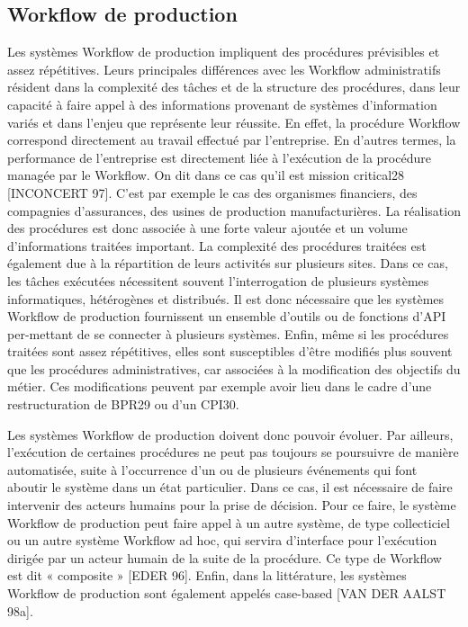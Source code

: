 \subsection{Workflow de production} 
Les systèmes Workflow de production impliquent des procédures prévisibles et assez répétitives. Leurs principales différences avec les Workflow administratifs résident dans la
complexité des tâches et de la structure des procédures, dans leur capacité à faire appel à des
informations provenant de systèmes d’information variés et dans l’enjeu que représente leur
réussite. En effet, la procédure Workflow correspond directement au travail effectué par
l’entreprise. En d’autres termes, la performance de l’entreprise est directement liée à
l’exécution de la procédure managée par le Workflow. On dit dans ce cas qu’il est mission
critical28 [INCONCERT 97]. C’est par exemple le cas des organismes financiers, des compagnies d’assurances, des usines de production manufacturières. La réalisation des procédures
est donc associée à une forte valeur ajoutée et un volume d’informations traitées important.
La complexité des procédures traitées est également due à la répartition de leurs activités
sur plusieurs sites. Dans ce cas, les tâches exécutées nécessitent souvent l’interrogation de
plusieurs systèmes informatiques, hétérogènes et distribués. Il est donc nécessaire que les systèmes Workflow de production fournissent un ensemble d’outils ou de fonctions d’API per-mettant de se connecter à plusieurs systèmes. Enfin, même si les procédures traitées sont assez répétitives, elles sont susceptibles d’être modifiés plus souvent que les procédures administratives, car associées à la modification des objectifs du métier. Ces modifications peuvent
par exemple avoir lieu dans le cadre d’une restructuration de BPR29 ou d’un CPI30. 

Les systèmes Workflow de production doivent donc pouvoir évoluer. Par ailleurs,
l’exécution de certaines procédures ne peut pas toujours se poursuivre de manière automatisée, suite à l’occurrence d’un ou de plusieurs événements qui font aboutir le système dans un
état particulier. Dans ce cas, il est nécessaire de faire intervenir des acteurs humains pour la
prise de décision. Pour ce faire, le système Workflow de production peut faire appel à un autre système, de type collecticiel ou un autre système Workflow ad hoc, qui servira d’interface
pour l’exécution dirigée par un acteur humain de la suite de la procédure. Ce type de Workflow est dit « composite » [EDER 96]. Enfin, dans la littérature, les systèmes Workflow de
production sont également appelés case-based [VAN DER AALST 98a]. 

